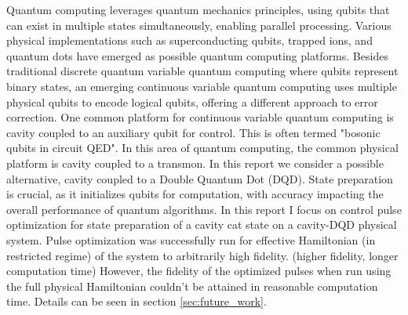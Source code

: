 \documentclass[12pt]{article}
\begin{document}
Quantum computing leverages quantum mechanics principles, using qubits that can exist in multiple states simultaneously, enabling parallel processing. 
Various physical implementations such as superconducting qubits, trapped ions, and quantum dots have emerged as possible quantum computing platforms.
Besides traditional discrete quantum variable quantum computing where qubits represent binary states, an emerging continuous variable quantum computing uses multiple physical qubits to encode logical qubits, offering a different approach to error correction. \cite{RevModPhys.77.513}
One common platform for continuous variable quantum computing is cavity coupled to an auxiliary qubit for control.
This is often termed "bosonic qubits in circuit QED".\cite{Joshi_2021} In this area of quantum computing, the common physical platform is cavity coupled to a transmon. In this report we consider a possible alternative, cavity coupled to a Double Quantum Dot (DQD). \cite{D_Anjou_2019}
State preparation is crucial, as it initializes qubits for computation, with accuracy impacting the overall performance of quantum algorithms. \cite{Nielsen2010}
In this report I focus on control pulse optimization for state preparation of a cavity cat state on a cavity-DQD physical system. 
Pulse optimization was successfully run for effective Hamiltonian (in restricted regime) of the system to arbitrarily high fidelity. (higher fidelity, longer computation time)
However, the fidelity of the optimized pulses when run using the full physical Hamiltonian couldn't be attained in reasonable computation time. 
Details can be seen in section \ref{sec:future_work}.
\end{document}
